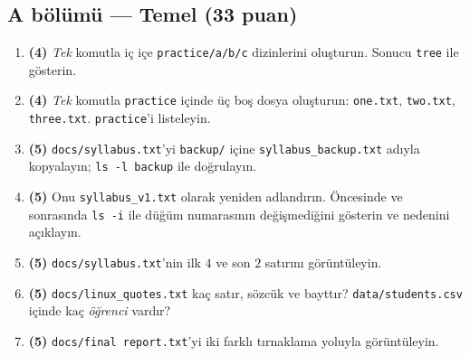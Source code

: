 \documentclass[11pt,a4paper]{article}
\newcommand{\cmd}[1]{\texttt{#1}}
\begin{document}
\subsection*{A bölümü --- Temel (33 puan)}
\begin{enumerate}[leftmargin=2.2em,label=\textbf{\arabic*.}]
  \item \textbf{(4)} \emph{Tek} komutla iç içe \texttt{practice/a/b/c} dizinlerini oluşturun. Sonucu \cmd{tree} ile gösterin.
  \item \textbf{(4)} \emph{Tek} komutla \texttt{practice} içinde üç boş dosya oluşturun: \texttt{one.txt}, \texttt{two.txt}, \texttt{three.txt}. \texttt{practice}'i listeleyin.
  \item \textbf{(5)} \texttt{docs/syllabus.txt}'yi \texttt{backup/} içine \texttt{syllabus\_backup.txt} adıyla kopyalayın; \cmd{ls -l backup} ile doğrulayın.
  \item \textbf{(5)} Onu \texttt{syllabus\_v1.txt} olarak yeniden adlandırın. Öncesinde ve sonrasında \cmd{ls -i} ile düğüm numarasının değişmediğini gösterin ve nedenini açıklayın.
  \item \textbf{(5)} \texttt{docs/syllabus.txt}'nin ilk $4$ ve son $2$ satırını görüntüleyin.
  \item \textbf{(5)} \texttt{docs/linux\_quotes.txt} kaç satır, sözcük ve bayttır? \texttt{data/students.csv} içinde kaç \emph{öğrenci} vardır?
  \item \textbf{(5)} \texttt{docs/final report.txt}'yi iki farklı tırnaklama yoluyla görüntüleyin.
\end{enumerate}
\end{document}
